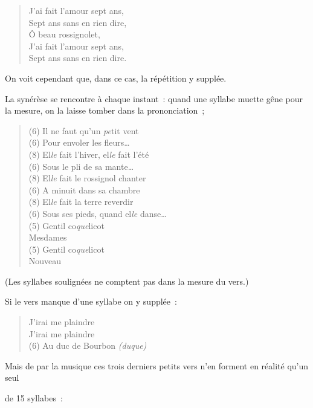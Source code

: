 \documentclass[french,twoside]{book} %
\begin{document}
\begin{verse}
J’ai fait l’amour sept ans,\\
Sept ans sans en rien dire,\\
Ô beau rossignolet,\\
J’ai fait l’amour sept ans,\\
Sept ans sans en rien dire.\\
\end{verse}

\noindent On voit cependant que, dans ce cas, la répétition y supplée.\par
La synérèse se rencontre à chaque instant : quand une syllabe muette gêne pour la mesure, on la laisse tomber dans la prononciation ;\par


\begin{verse}
(6) Il ne faut qu’un {\itshape pe}tit vent\\
(6) Pour envoler les fleurs…\\
(8) El{\itshape le} fait l’hiver, el{\itshape le} fait l’été\\
(6) Sous le pli de sa mante…\\
(8) El{\itshape le} fait le rossignol chanter\\
(6) A minuit dans sa chambre\\
(8) El{\itshape le} fait la terre reverdir\\
(6) Sous ses pieds, quand el{\itshape le} danse…\\
(5) Gentil co{\itshape que}licot\\
Mesdames\\
(5) Gentil co{\itshape que}licot\\
Nouveau\\
\end{verse}

\noindent (Les syllabes soulignées ne comptent pas dans la mesure du vers.)\par
Si le vers manque d’une syllabe on y supplée :\par


\begin{verse}
J’irai me plaindre\\
J’irai me plaindre\\
(6) Au duc de Bourbon {\itshape (duque)}\\
\end{verse}

\noindent Mais de par la musique ces trois derniers petits vers n’en forment en réalité qu’un seul\par
de 15 syllabes :\par
\end{document}
